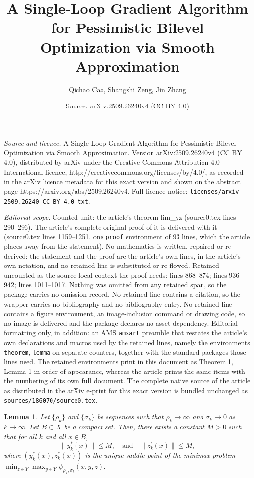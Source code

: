 \documentclass[10pt,a4paper]{amsart}
\title{A Single-Loop Gradient Algorithm for Pessimistic Bilevel Optimization via Smooth Approximation}
\author{Qichao Cao, Shangzhi Zeng, Jin Zhang}
\date{Source: arXiv:2509.26240v4 (CC BY 4.0)}
\newtheorem{lemma}{Lemma}
\begin{document}
\maketitle

\noindent\emph{Source and licence.} A Single-Loop Gradient Algorithm for Pessimistic Bilevel Optimization via Smooth Approximation. Version arXiv:2509.26240v4 (CC BY 4.0), distributed by arXiv under the Creative Commons Attribution 4.0 International licence, http://creativecommons.org/licenses/by/4.0/, as recorded in the arXiv licence metadata for this exact version and shown on the abstract page https://arxiv.org/abs/2509.26240v4. Full licence notice: \texttt{licenses/arxiv-2509.26240-CC-BY-4.0.txt}.\par\smallskip

\noindent\textit{Editorial scope.} Counted unit: the article's theorem lim\_yz (source0.tex lines 290--296). The article's complete original proof of it is delivered with it (source0.tex lines 1159--1251, one \texttt{proof} environment of 93 lines, which the article places away from the statement). No mathematics is written, repaired or re-derived: the statement and the proof are the article's own lines, in the article's own notation, and no retained line is substituted or re-flowed.  Retained uncounted as the source-local context the proof needs: lines 868--874; lines 936--942; lines 1011--1017.  Nothing was omitted from any retained span, so the package carries no omission record.  No retained line contains a citation, so the wrapper carries no bibliography and no bibliography entry.  No retained line contains a figure environment, an image-inclusion command or drawing code, so no image is delivered and the package declares no asset dependency.  Editorial formatting only, in addition: an AMS \texttt{amsart} preamble that restates the article's own declarations and macros used by the retained lines, namely the environments \texttt{theorem}, \texttt{lemma} on separate counters, together with the standard packages those lines need.  The retained environments print in this document as Theorem 1, Lemma 1 in order of appearance, whereas the article prints the same items with the numbering of its own full document.  The complete native source of the article as distributed in the arXiv e-print for this exact version is bundled unchanged as \texttt{sources/186070/source0.tex}.
\begin{lemma}\label{saddlepointboundedness}
 Let $\{\rho_k\}$ and $\{\sigma_k\}$ be sequences such that $\rho_k \rightarrow \infty$ and $\sigma_k \rightarrow 0$ as $k \rightarrow \infty$. Let $B \subset X$ be a compact set. Then, there exists a constant $M > 0$ such that for all $k$ and all $x \in B$,
 \[
 \|y^*_{k}(x)\| \le M, \quad \text{and} \quad \|z^*_{k}(x)\| \le M,
 \]
 where $(y_{k}^*(x),z_{k}^*(x))$ is the unique saddle point of the minimax problem $\min_{z\in {Y}} \max_{ y \in {Y}}\psi_{\rho_k,\sigma_k}(x, y, z)$.
\end{lemma}
\end{document}
